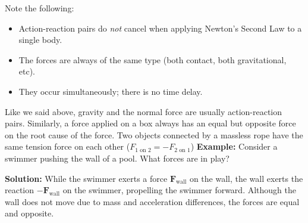 Note the following:
\begin{itemize}
    \item Action-reaction pairs do \emph{not} cancel when applying Newton's Second Law to a single body.
    \item The forces are always of the same type (both contact, both gravitational, etc).
    \item They occur simultaneously; there is no time delay.
\end{itemize}

Like we said above, gravity and the normal force are usually action-reaction pairs. Similarly, a force applied on a box always has an equal but opposite force on the root cause of the force. Two objects connected by a massless rope have the same tension force on each other ($F_\text{1 on 2} = - F_\text{2 on 1}$)
\textbf{Example:}
Consider a swimmer pushing the wall of a pool. What forces are in play?

\textbf{Solution:}
While the swimmer exerts a force \(\mathbf{F}_{\text{wall}}\) on the wall, the wall exerts the reaction \(-\mathbf{F}_{\text{wall}}\) on the swimmer, propelling the swimmer forward.  
Although the wall does not move due to mass and acceleration differences, the forces are equal and opposite. 

